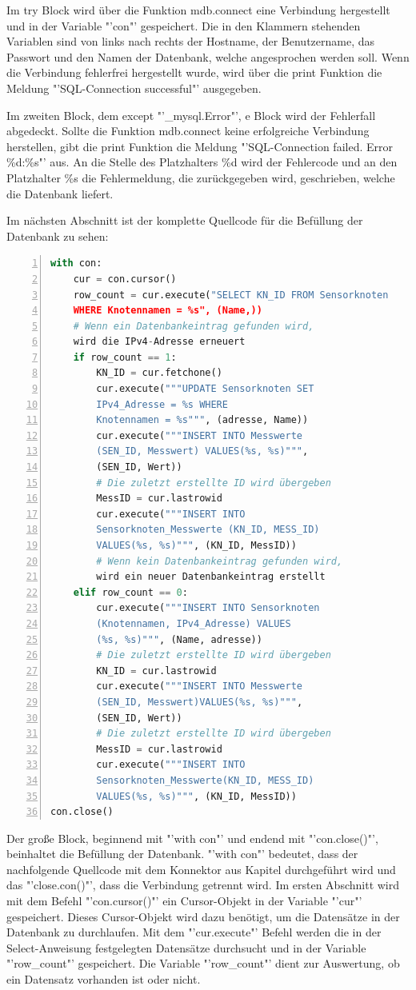 Im try Block wird über die Funktion mdb.connect eine Verbindung hergestellt und in der Variable "'con"' \label{con} gespeichert. Die in den Klammern stehenden Variablen sind von links nach rechts der Hostname, der Benutzername, das Passwort und den Namen der Datenbank, welche angesprochen werden soll. Wenn die Verbindung fehlerfrei hergestellt wurde, wird über die print Funktion die Meldung "'SQL-Connection successful"' ausgegeben.

Im zweiten Block, dem except "'\_mysql.Error"', e Block wird der Fehlerfall abgedeckt. Sollte die Funktion mdb.connect keine erfolgreiche Verbindung herstellen, gibt die print Funktion die Meldung "'SQL-Connection failed. Error \%d:\%s"' aus. An die Stelle des Platzhalters \%d wird der Fehlercode und an den Platzhalter \%s die Fehlermeldung, die zurückgegeben wird, geschrieben, welche die Datenbank liefert.

Im nächsten Abschnitt ist der komplette Quellcode für die Befüllung der Datenbank zu sehen:
\begin{lstlisting}[caption=Befüllung der Datenbank,frame=single,numbers=left,language=Python,showstringspaces=false]
with con:
	cur = con.cursor()
	row_count = cur.execute("SELECT KN_ID FROM Sensorknoten
	WHERE Knotennamen = %s", (Name,))
	# Wenn ein Datenbankeintrag gefunden wird,
	wird die IPv4-Adresse erneuert
	if row_count == 1:
		KN_ID = cur.fetchone()
		cur.execute("""UPDATE Sensorknoten SET
		IPv4_Adresse = %s WHERE
		Knotennamen = %s""", (adresse, Name))
		cur.execute("""INSERT INTO Messwerte 
		(SEN_ID, Messwert) VALUES(%s, %s)""",
		(SEN_ID, Wert))
		# Die zuletzt erstellte ID wird übergeben
		MessID = cur.lastrowid
		cur.execute("""INSERT INTO 
		Sensorknoten_Messwerte (KN_ID, MESS_ID)
		VALUES(%s, %s)""", (KN_ID, MessID))
		# Wenn kein Datenbankeintrag gefunden wird,
		wird ein neuer Datenbankeintrag erstellt
	elif row_count == 0:
		cur.execute("""INSERT INTO Sensorknoten
		(Knotennamen, IPv4_Adresse) VALUES
		(%s, %s)""", (Name, adresse))
		# Die zuletzt erstellte ID wird übergeben
		KN_ID = cur.lastrowid
		cur.execute("""INSERT INTO Messwerte
		(SEN_ID, Messwert)VALUES(%s, %s)""",
		(SEN_ID, Wert))
		# Die zuletzt erstellte ID wird übergeben
		MessID = cur.lastrowid
		cur.execute("""INSERT INTO 
		Sensorknoten_Messwerte(KN_ID, MESS_ID)
		VALUES(%s, %s)""", (KN_ID, MessID))
con.close()
\end{lstlisting}
Der große Block, beginnend mit "'with con"' und endend mit "'con.close()"', beinhaltet die Befüllung der Datenbank. "'with con"' bedeutet, dass der nachfolgende Quellcode mit dem Konnektor aus Kapitel  durchgeführt wird und das "'close.con()"', dass die Verbindung getrennt wird. Im ersten Abschnitt wird mit dem Befehl "'con.cursor()"' ein Cursor-Objekt in der Variable "'cur"' gespeichert. Dieses Cursor-Objekt wird dazu benötigt, um die Datensätze in der Datenbank zu durchlaufen. Mit dem "'cur.execute"' Befehl werden die in der Select-Anweisung festgelegten Datensätze durchsucht und in der Variable "'row\_count"' gespeichert. Die Variable "'row\_count"' dient zur Auswertung, ob ein Datensatz vorhanden ist oder nicht.
 
